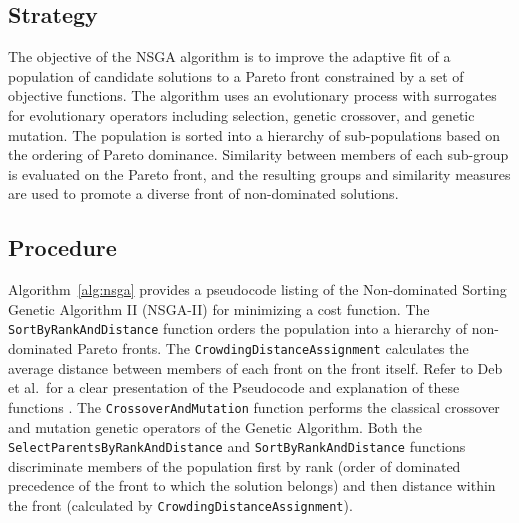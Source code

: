 \subsection{Strategy}
The objective of the NSGA algorithm is to improve the adaptive fit of a population of candidate solutions to a Pareto front constrained by a set of objective functions.
The algorithm uses an evolutionary process with surrogates for evolutionary operators including selection, genetic crossover, and genetic mutation. 
The population is sorted into a hierarchy of sub-populations based on the ordering of Pareto dominance. Similarity between members of each sub-group is evaluated on the Pareto front, and the resulting groups and similarity measures are used to promote a diverse front of non-dominated solutions.

\subsection{Procedure}
Algorithm~\ref{alg:nsga} provides a pseudocode listing of the Non-dominated Sorting Genetic Algorithm II (NSGA-II) for minimizing a cost function. 
The \texttt{SortByRankAndDistance} function orders the population into a hierarchy of non-dominated Pareto fronts. The \texttt{CrowdingDistanceAssignment} calculates the average distance between members of each front on the front itself. Refer to Deb et al.\ for a clear presentation of the Pseudocode and explanation of these functions \cite{Deb2002}. The \texttt{CrossoverAndMutation} function performs the classical crossover and mutation genetic operators of the Genetic Algorithm. Both the \texttt{SelectParentsByRankAndDistance} and \texttt{SortByRankAndDistance} functions discriminate members of the population first by rank (order of dominated precedence of the front to which the solution belongs) and then distance within the front (calculated by \texttt{CrowdingDistanceAssignment}).

